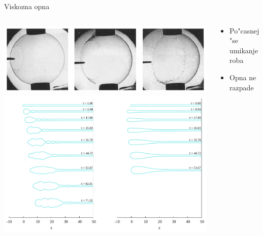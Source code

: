 \documentclass{beamer}
\begin{document}
\begin{frame}{Viskozna opna}
\begin{columns}
  \begin{column}{.65\textwidth}
 \includegraphics[width=\textwidth]{./Slike/meh-vis-1} \\
 \includegraphics[width=\textwidth]{./Slike/scat-rezultat-1} 
  \end{column}

\begin{column}{.35\textwidth}
 \begin{itemize}
  \item Po"casnej"se umikanje roba
  \item Opna ne razpade
 \end{itemize} 
\end{column}

\end{columns}

 
\end{frame}
 
\end{document}
